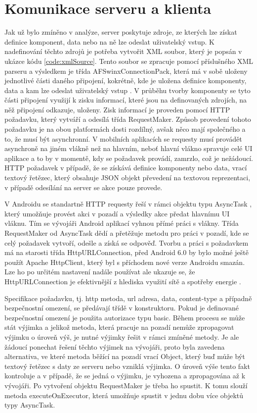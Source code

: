 \section{Komunikace serveru a klienta}
Jak už bylo zmíněno v analýze, server poskytuje zdroje, ze kterých lze získat definice komponent, data nebo na ně lze odeslat uživatelský vstup. K nadefinování těchto zdrojů je potřeba vytvořit XML soubor, který je popsán v ukázce kódu \ref{code:xmlSource}. Tento soubor se zpracuje pomocí příslušného XML parseru a výsledkem je třída AFSwinxConnectionPack, která má v sobě uloženy jednotlivé části daného připojení, kokrétně, kde je uložena definice komponenty, data a kam lze odeslat uživatelský vstup \cite{tomasek-thesis}. V průběhu tvorby komponenty se tyto části připojení využijí k zisku informací, které jsou na definovaných zdrojích, na něž připojení odkazuje, uloženy. Zisk informací je proveden pomocí HTTP požadavku, který vytváří a odesílá třída RequestMaker. Způsob provedení tohoto požadavku je na obou platformách dosti rozdílný, avšak něco mají společného a to, že musí být asynchronní. V mobilních aplikacích se requesty musí provádět asynchroně na jiném vlákně než na hlavním, neboť hlavní vlákno spravuje celé UI aplikace a to by v momentě, kdy se požadavek provádí, zamrzlo, což je nežádoucí. HTTP požadavek v případě, že se získává definice komponenty nebo data, vrací textový řetězec, který obsahuje JSON objekt převedení na textovou reprezentaci, v případě odesílání na server se akce pouze provede.

V Androidu se standartně HTTP requesty řeší v rámci objektu typu AsyncTask \cite{asynctask}, který umožňuje provést akci v pozadí a výsledky akce předat hlavnímu UI vláknu. Tím se vývojáři Android aplikací vyhnou přímé práci s vlákny. Třída RequestMaker od AsyncTask dědí a přetěžuje metodu pro práci v pozadí, kde se celý požadavek vytvoří, odešle a získá se odpověď. Tvorbu a práci s požadavkem má na starosti třída HttpURLConnection, před Android 6.0 by bylo možné ještě použít Apache HttpClient, který byl s příchodem nové verze Androidu smazán. Lze ho po určitém nastavení nadále používat ale ukazuje se, že HttpURLConnection je efektivnější z hlediska využití sítě a spotřeby energie \cite{httpclientremoval}. 

Specifikace požadavku, tj. http metoda, url adresa, data, content-type a případně bezpečnostní omezení, se předávají třídě v konstruktoru. Pokud je definované bezpečnostní omezení je použita autorizace typu basic. Během procesu se může stát výjimka a jelikož metoda, která pracuje na pozadí nemůže zpropagovat výjimku o úroveň výš, je nutné výjimky řešit v rámci zmíněné metody. Je ale žádoucí ponechat řešení těchto výjimek na vývojáři, proto byla zavedena alternativa, ve které metoda běžící na pozadí vrací Object, který buď může být textový řetězec s daty ze serveru nebo vzniklá výjimka. O úroveň výše tento fakt kontroluje a v případě, že se jedná o výjimku, je vyhozena a zpropagována až k vývojáři. 
Po vytvoření objektu RequestMaker je třeba ho spustit. K tomu slouží metoda executeOnExecutor, která umožňuje spustit v jednu dobu více objektů typy AsyncTask.

